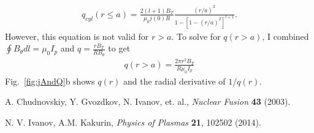 \documentclass{article}
\begin{document}
\begin{equation} \label{qCylindrical}
\begin{split}
q_{cyl}(r\leq a)=\frac{2(l+1)B_T}{\mu_0 j(0) R} \frac{(r/a)^2}{1-\left[ 1-(r/a)^2\right]^{l+1}}.
\end{split} 
\end{equation} 
However, this equation is not valid for $r>a$.  To solve for $q(r>a)$, I combined $\oint B_{\theta} dl = \mu_0 I_p$ and $q=\frac{rB_T}{RB_{\theta}}$ to get 
\begin{equation} \label{qCylindrical}
\begin{split}
q(r>a)=\frac{2\pi r^2B_T}{R\mu_0I_p}
\end{split} 
\end{equation} 
Fig.~\ref{fig:jAndQ}b shows $q(r)$ and the radial derivative of $1/q(r)$.  







\begin{thebibliography}{}

A. Chudnovskiy, Y. Gvozdkov, N. Ivanov, et. al.,
\emph{Nuclear Fusion}
{\bf 43} (2003). 

N. V. Ivanov, A.M. Kakurin,
\emph{Physics of Plasmas}
{\bf 21}, 102502 (2014). 


\end{thebibliography}

\end{document}
